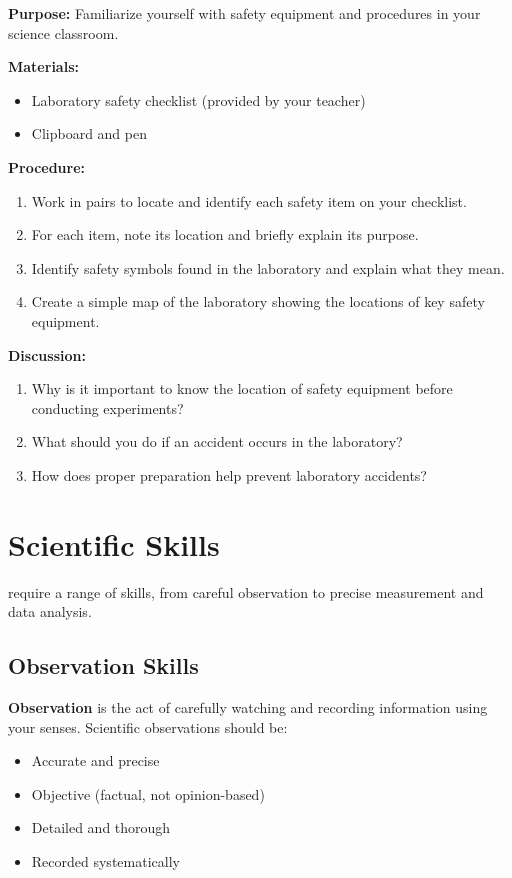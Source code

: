 \documentclass[justified,notoc]{tufte-book}
\newcommand{\keyword}[1]{\textbf{#1}\marginnote{\textbf{#1}: }}
\newenvironment{investigation}[1]{%
    \begin{tcolorbox}[colback=info!10,colframe=info,title=\textbf{Investigation: #1}]
}{%
    \end{tcolorbox}
}
\begin{document}
\begin{investigation}{Laboratory Safety Scavenger Hunt}
\textbf{Purpose:} Familiarize yourself with safety equipment and procedures in your science classroom.

\textbf{Materials:}
\begin{itemize}
    \item Laboratory safety checklist (provided by your teacher)
    \item Clipboard and pen
\end{itemize}

\textbf{Procedure:}
\begin{enumerate}
    \item Work in pairs to locate and identify each safety item on your checklist.
    \item For each item, note its location and briefly explain its purpose.
    \item Identify safety symbols found in the laboratory and explain what they mean.
    \item Create a simple map of the laboratory showing the locations of key safety equipment.
\end{enumerate}

\textbf{Discussion:}
\begin{enumerate}
    \item Why is it important to know the location of safety equipment before conducting experiments?
    \item What should you do if an accident occurs in the laboratory?
    \item How does proper preparation help prevent laboratory accidents?
\end{enumerate}
\end{investigation}

\section{Scientific Skills}

 require a range of skills, from careful observation to precise measurement and data analysis.

\subsection{Observation Skills}

\keyword{Observation} is the act of carefully watching and recording information using your senses. Scientific observations should be:
\begin{itemize}
    \item Accurate and precise
    \item Objective (factual, not opinion-based)
    \item Detailed and thorough
    \item Recorded systematically
\end{itemize}
\end{document}
